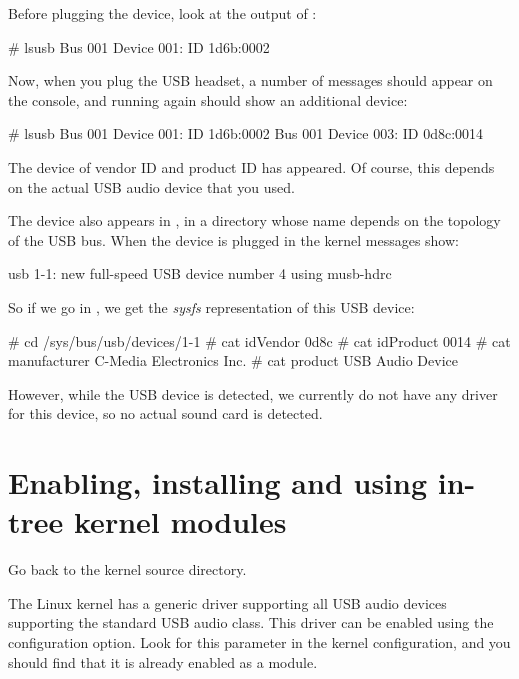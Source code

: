 {Before plugging the device, look at the output of :

\begin{bashinput}
# lsusb
Bus 001 Device 001: ID 1d6b:0002
\end{bashinput}

Now, when you plug the USB headset, a number of messages should appear
on the console, and running  again should show an
additional device:

\begin{bashinput}
# lsusb
Bus 001 Device 001: ID 1d6b:0002
Bus 001 Device 003: ID 0d8c:0014
\end{bashinput}

The device of vendor ID  and product ID  has
appeared. Of course, this depends on the actual USB audio device
that you used.

The device also appears in , in a
directory whose name depends on the topology of the USB bus. When the
device is plugged in the kernel messages show:

\begin{bashinput}
usb 1-1: new full-speed USB device number 4 using musb-hdrc
\end{bashinput}

So if we go in , we get the {\em
sysfs} representation of this USB device:

\begin{bashinput}
# cd /sys/bus/usb/devices/1-1
# cat idVendor
0d8c
# cat idProduct
0014
# cat manufacturer
C-Media Electronics Inc.
# cat product
USB Audio Device
\end{bashinput}

However, while the USB device is detected, we currently do not have
any driver for this device, so no actual sound card is detected.

\section{Enabling, installing and using in-tree kernel modules}

Go back to the kernel source directory.

The Linux kernel has a generic driver supporting all USB audio devices
supporting the standard USB audio class. This driver can be enabled
using the  configuration option. Look
for this parameter in the kernel configuration, and you should find
that it is already enabled as a module.

}
